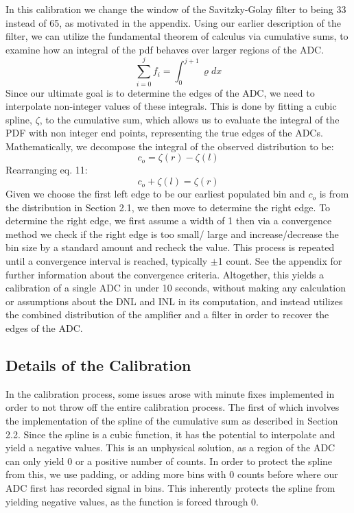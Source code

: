 \documentclass[11pt, letterpaper]{article}
\begin{document}
In this calibration we change the window of the Savitzky-Golay filter to being 33 instead of 65, as motivated in the appendix. 
Using our earlier description of the filter, we can utilize the fundamental theorem of calculus via cumulative sums, to examine how an integral of the pdf behaves over larger regions of the ADC. 
 \begin{equation}\label{}
\sum_{i=0}^{j} f_i= \int_{0}^{j+1} \varrho dx
\end{equation}
Since our ultimate goal is to determine the edges of the ADC, we need to interpolate non-integer values of these integrals. 
This is done by fitting a cubic spline, $ \zeta$, to the cumulative sum, which allows us to evaluate the integral of the PDF with non integer end points, representing the true edges of the ADCs. 
Mathematically, we decompose the integral of the observed distribution to be:
 \begin{equation}\label{}
c_o = \zeta(r) - \zeta(l)
\end{equation}
Rearranging eq. 11: 
 \begin{equation}\label{}
c_o + \zeta(l) = \zeta(r)
\end{equation}
Given we choose the first left edge to be our earliest populated bin and $c_{o}$ is from the distribution in Section 2.1, we then move to determine the right edge. 
To determine the right edge, we first assume a width of 1 then via a convergence method we check if the right edge is too small/ large and increase/decrease the bin size by a standard amount and recheck the value. 
This process is repeated until a convergence interval is reached, typically $\pm$1 count. 
See the appendix for further information about the convergence criteria. 
Altogether, this yields a calibration of a single ADC in under 10 seconds, without making any calculation or assumptions about the DNL and INL in its computation, and instead utilizes the combined distribution of the amplifier and a filter in order to recover the edges of the ADC.  

\subsection{Details of the Calibration} 
\indent 


In the calibration process, some issues arose with minute fixes implemented in order to not throw off the entire calibration process. 
The first of which involves the implementation of the spline of the cumulative sum as described in Section 2.2. 
Since the spline is a cubic function, it has the potential to interpolate and yield a negative values. 
This is an unphysical solution, as a region of the ADC can only yield 0 or a positive number of counts. 
In order to protect the spline from this, we use padding, or adding more bins with 0 counts before where our ADC first has recorded signal in bins. 
This inherently protects the spline from yielding negative values, as the function is forced through 0. 
\indent 
\end{document}
